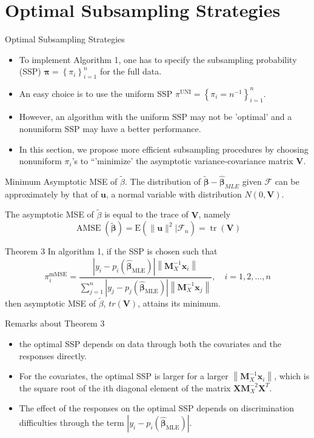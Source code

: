\documentclass[12pt]{beamer}
\begin{document}
\section{Optimal Subsampling Strategies}
\begin{frame}{Optimal Subsampling Strategies}
\begin{itemize}
\item To implement Algorithm 1, one has to specify the subsampling
probability (SSP) $\boldsymbol{\pi}=\left\{\pi_{i}\right\}_{i=1}^{n}$ for the full data.
\item An easy choice
is to use the uniform SSP $\pi^{\mathrm{UNI}}=\left\{\pi_{i}=n^{-1}\right\}_{i=1}^{n}$.
\item However, an
algorithm with the uniform SSP may not be 'optimal' and a
nonuniform SSP may have a better performance.
\item In this section,
we propose more efficient subsampling procedures by choosing
nonuniform $\pi_i$'s to “'minimize' the asymptotic variance-covariance
matrix $\mathbf{V}$.
\end{itemize}
\end{frame}

\begin{frame}{Minimum Asymptotic MSE of $\tilde{\beta}$.}
The distribution of $\tilde{\mathbf{\beta}}-\hat{\mathbf{\beta}}_{MLE}$ given $\mathcal{F}$ can be approximately by that of $\mathbf{u}$, a normal variable with distribution $N(0,\mathbf{V})$.

The asymptotic MSE of $ \tilde{\beta}$ is equal to the trace of $\mathbf{V}$, namely
$$
\operatorname{AMSE}(\tilde{\boldsymbol{\beta}})=\mathrm{E}\left(\|\mathbf{u}\|^{2} | \mathcal{F}_{n}\right)=\operatorname{tr}(\mathbf{V})
$$
\end{frame}

\begin{frame}{Theorem 3}
In algorithm 1, if the SSP is chosen such that
$$
\pi_{i}^{\mathrm{mMSE}}=\frac{\left|y_{i}-p_{i}\left(\hat{\boldsymbol{\beta}}_{\mathrm{MLE}}\right)\right|\left\|\mathbf{M}_{X}^{-1} \mathbf{x}_{i}\right\|}{\sum_{j=1}^{n}\left|y_{j}-p_{j}\left(\hat{\boldsymbol{\beta}}_{\mathrm{MLE}}\right)\right|\left\|\mathbf{M}_{X}^{-1} \mathbf{x}_{j}\right\|}, \quad i=1,2, \ldots, n
$$
then asymptotic MSE of $\tilde{\beta}$, $tr(\mathbf{V})$, attains its minimum.
\end{frame}

\begin{frame}{Remarks about Theorem 3}
\begin{itemize}
\item the optimal SSP depends on data through both the covariates and the responses directly.
\item For the covariates, the optimal SSP is larger for a larger $\left\|\mathbf{M}_{X}^{-1} \mathbf{x}_{i}\right\|$, which is the square root of the ith diagonal element
of the matrix $\mathbf{X} \mathbf{M}_{X}^{-2} \mathbf{X}^{T}$.
\item The effect of the responses on the optimal
SSP depends on discrimination difficulties through the term $\left|y_{i}-p_{i}\left(\hat{\boldsymbol{\beta}}_{\mathrm{MLE}}\right)\right|$.
\end{itemize}
\end{frame}
\end{document}
